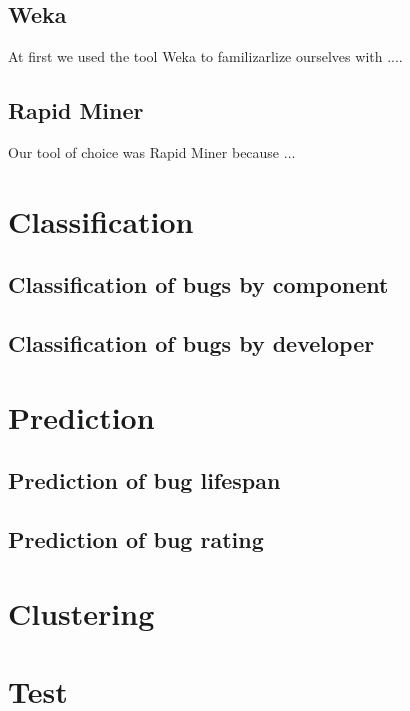 \subsection{Weka} %
\label{sub:Weka}

At first we used the tool Weka to familizarlize ourselves with ....


\subsection{Rapid Miner} %
\label{sub:Rapid Miner}

Our tool of choice was Rapid Miner because ...



\section{Classification} %
\label{sub:Classification}

\subsection{Classification of bugs by component} %
\label{sub:Classification of bugs bugs by component}

\subsection{Classification of bugs by developer} %
\label{sub:Classification of bugs bugs by developer}


\section{Prediction} %
\label{sub:Prediction}

\subsection{Prediction of bug lifespan} %
\label{sub:Prediction of bug lifespan}

\subsection{Prediction of bug rating} %
\label{sub:Prediction of bug rating}


\section{Clustering} %
\label{sub:Clustering}

\section{Test} %
\label{sec:Test}

